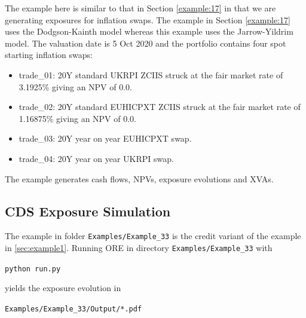 \documentclass[12pt, a4paper]{article}
\begin{document}
The example here is similar to that in Section \ref{example:17} in that we are generating exposures for inflation swaps. The example in Section \ref{example:17} uses the Dodgson-Kainth model whereas this example uses the Jarrow-Yildrim model. The valuation date is 5 Oct 2020 and the portfolio contains four spot starting inflation swaps:

\begin{itemize}
\item trade\_01: 20Y standard UKRPI ZCIIS struck at the fair market rate of 3.1925\% giving an NPV of 0.0. 
\item trade\_02: 20Y standard EUHICPXT ZCIIS struck at the fair market rate of 1.16875\% giving an NPV of 0.0.
\item trade\_03: 20Y year on year EUHICPXT swap.
\item trade\_04: 20Y year on year UKRPI swap.
\end{itemize}

The example generates cash flows, NPVs, exposure evolutions and XVAs.

\subsection{CDS Exposure Simulation}%
\label{example:33}

The example in folder {\tt Examples/Example\_33} is the credit variant of the example in
\ref{sec:example1}. Running ORE in directory {\tt Examples/Example\_33} with

\medskip
\centerline{\tt python run.py } 
\medskip

yields the exposure evolution in 

\medskip
\centerline{\tt Examples/Example\_33/Output/*.pdf } 
\medskip
\end{document}
